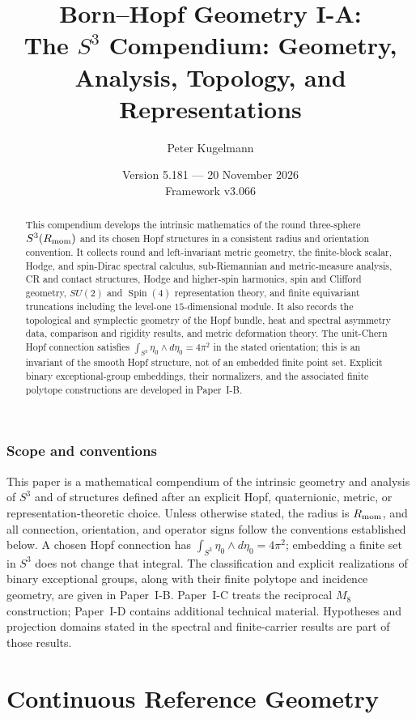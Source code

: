 \documentclass[11pt]{article}
\title{\textbf{Born--Hopf Geometry I-A:}\\[0.4em]\large The $S^3$ Compendium: Geometry, Analysis, Topology, and Representations}
\author{Peter Kugelmann}
\date{Version 5.181 --- 20 November 2026 \\ Framework v3.066}
\begin{document}
\maketitle
\begin{abstract}
This compendium develops the intrinsic mathematics of the round three-sphere
$S^3(R_{\mathrm{mom}})$ and its chosen Hopf structures in a consistent radius and
orientation convention.  It collects round and left-invariant metric geometry,
the finite-block scalar, Hodge, and spin-Dirac spectral calculus,
sub-Riemannian and metric-measure analysis, CR and contact structures,
Hodge and higher-spin harmonics, spin and Clifford geometry,
$SU(2)$ and $\operatorname{Spin}(4)$ representation theory, and finite
equivariant truncations including the level-one $15$-dimensional module.
It also records the topological and symplectic geometry of the Hopf bundle,
heat and spectral asymmetry data, comparison and rigidity results, and metric
deformation theory.  The unit-Chern Hopf connection satisfies
$\int_{S^3}\eta_0\wedge d\eta_0=4\pi^2$ in the stated orientation;
this is an invariant of the smooth Hopf structure, not of an embedded finite
point set.  Explicit binary exceptional-group embeddings, their normalizers,
and the associated finite polytope constructions are developed in Paper~I-B.
\end{abstract}
\tableofcontents
\clearpage
\section*{Scope and conventions}
This paper is a mathematical compendium of the intrinsic geometry and
analysis of $S^3$ and of structures defined after an explicit Hopf,
quaternionic, metric, or representation-theoretic choice.  Unless otherwise
stated, the radius is $R_{\mathrm{mom}}$, and all connection, orientation, and operator
signs follow the conventions established below.  A chosen Hopf connection
has $\int_{S^3}\eta_0\wedge d\eta_0=4\pi^2$; embedding a finite set in
$S^3$ does not change that integral.  The classification and explicit
realizations of binary exceptional groups, along with their finite
polytope and incidence geometry, are given in Paper~I-B.  Paper~I-C treats
the reciprocal $M_8$ construction; Paper~I-D contains additional technical
material.  Hypotheses and projection domains stated in the spectral and
finite-carrier results are part of those results.

\part{Continuous Reference Geometry}
\label{p1:part:foundational-geometry}
\end{document}
